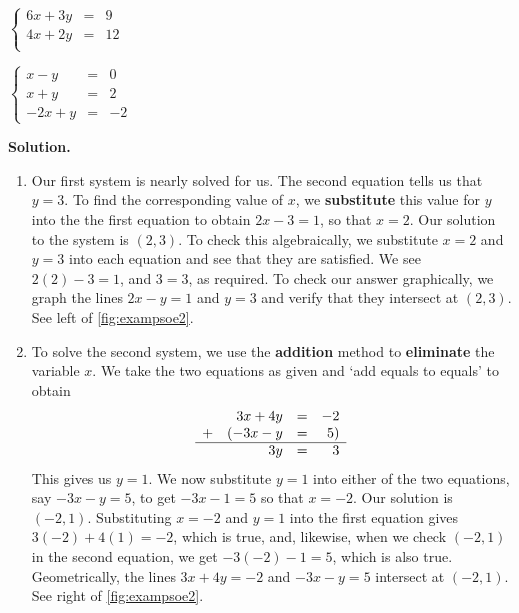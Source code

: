 \begin{ex}
\begin{tasks}
\task  $\left\{ \begin{array}{rcr} 6x + 3y & = & 9 \\ 4x + 2y & = & 12 \\ \end{array} \right.$ 

\task  $\left\{ \begin{array}{rcr} x - y & = & 0 \\ x + y & = & 2 \\ -2x + y & = & -2 \end{array} \right.$

\end{tasks}

{\bf Solution.}

\begin{enumerate}

\item  Our first system is nearly solved for us.  The second equation tells us that $y=3$.  To find the corresponding value of $x$, we \textbf{substitute} this value for $y$ into the the first equation to obtain $2x -  3 = 1$, so that $x = 2$.  Our solution to the system is $(2,3)$.  To check this algebraically, we substitute $x=2$ and $y=3$ into each equation and see that they are satisfied.  We see $2(2) - 3 = 1$, and $3=3$, as required.  To check our answer graphically, we graph the lines $2x-y = 1$ and $y=3$ and verify that they intersect at $(2,3)$. See left of \autoref{fig:exampsoe2}.

\setlength{\extrarowheight}{2pt}

\item  To solve the second system, we use the \textbf{addition} method to \textbf{eliminate} the variable $x$.  We take the two equations as given and `add equals to equals' to obtain \[ \begin{array}{lrcr} & 3x+4y & = & -2  \\ + & (-3x-y  & = & 5 ) \\ \hline & 3y & = & 3\end{array}\] This gives us $y = 1$.  We now substitute $y=1$ into either of the two equations, say $-3x-y = 5$, to get $-3x-1 = 5$ so that $x = -2$.  Our solution is $(-2,1)$.  Substituting $x=-2$ and $y=1$ into the first equation gives $3(-2) + 4(1) = -2$, which is true, and, likewise, when we check $(-2, 1)$ in the second equation, we get $-3(-2) - 1 = 5$, which is also true.  Geometrically, the lines $3x+4y = -2$ and $-3x-y=5$ intersect at $(-2,1)$. See right of \autoref{fig:exampsoe2}.


\end{enumerate}
\end{ex}

